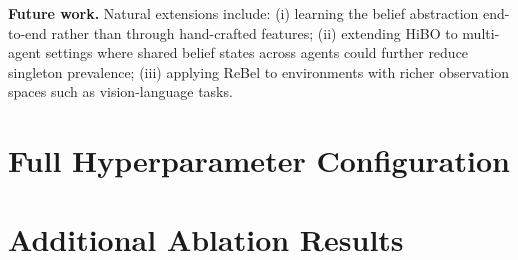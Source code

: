 \documentclass{article}
\begin{document}
\textbf{Future work.}
Natural extensions include: (i) learning the belief abstraction end-to-end
rather than through hand-crafted features; (ii) extending HiBO to multi-agent
settings where shared belief states across agents could further reduce singleton
prevalence; (iii) applying ReBel to environments with richer observation spaces
such as vision-language tasks.






\appendix

\section{Full Hyperparameter Configuration}
\label{app:config}



\section{Additional Ablation Results}
\label{app:ablation}


\end{document}
